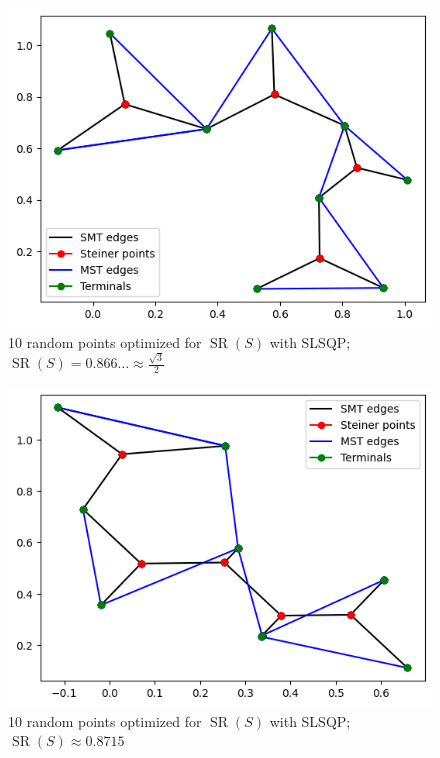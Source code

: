 \documentclass{mpaper}
\begin{document}
\begin{figure}
  \begin{center}
  \includegraphics[scale=0.5]{plot7.png}
  \end{center}
  \caption{\label{fig:7}10 random points optimized for $\operatorname{SR}(S)$ with SLSQP; $\operatorname{SR}(S)=0.866\dots\approx\frac{\sqrt{3}}{2}$}
\end{figure}

\begin{figure}
  \begin{center}
  \includegraphics[scale=0.5]{plot8715.png}
  \end{center}
  \caption{\label{fig:8}10 random points optimized for $\operatorname{SR}(S)$ with SLSQP; $\operatorname{SR}(S)\approx 0.8715$}
\end{figure}
\end{document}
